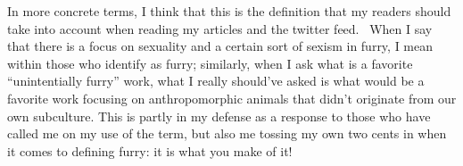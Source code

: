 In more concrete terms, I think that this is the definition that my
readers should take into account when reading my articles and the
twitter feed. ~When I say that there is a focus on sexuality and a
certain sort of sexism in furry, I mean within those who identify as
furry; similarly, when I ask what is a favorite ``unintentially furry''
work, what I really should've asked is what would be a favorite work
focusing on anthropomorphic animals that didn't originate from our own
subculture. This is partly in my defense as a response to those who have
called me on my use of the term, but also me tossing my own two cents in
when it comes to defining furry: it is what you make of it!
